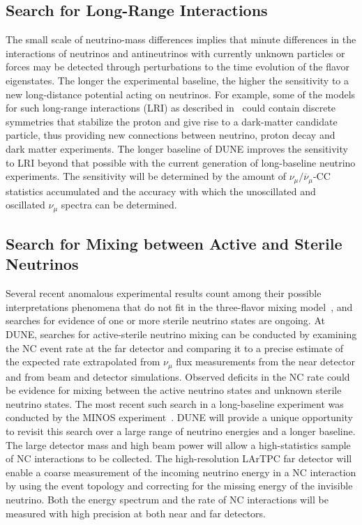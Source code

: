 \subsection{Search for Long-Range Interactions}

The small scale of neutrino-mass differences implies that minute
differences in the interactions of neutrinos and antineutrinos with
currently unknown particles or forces may be detected through 
perturbations to the time evolution of the flavor eigenstates.  
The longer the experimental
baseline, the higher the sensitivity to a new long-distance potential
acting on neutrinos. For example, some of the models for such
long-range interactions (LRI) as described in~\cite{Davoudiasl:2011sz} could contain discrete symmetries that
stabilize the proton and give rise to a dark-matter candidate particle,
thus providing new
connections between neutrino, proton decay and dark matter
experiments. The longer baseline of DUNE improves the sensitivity to
LRI beyond that possible with the current generation of long-baseline
neutrino experiments. The sensitivity will be determined by the amount
of $\nu_\mu/\overline{\nu}_\mu$-CC statistics accumulated and the accuracy
with which the unoscillated and oscillated $\nu_\mu$ spectra can be
determined.

\subsection{Search for Mixing between Active and Sterile Neutrinos}

Several recent anomalous experimental results count among their possible
interpretations phenomena that do not fit in the three-flavor mixing
model~\cite{Aguilar:2001ty,AguilarArevalo:2007it,Aguilar-Arevalo:2013pmq,Mention:2011rk,Giunti:2010zu}, 
and searches for evidence of one or more sterile neutrino states are ongoing.
At DUNE, searches for active-sterile neutrino mixing can be
conducted by examining the NC event rate at the far detector and
comparing it to a precise estimate of the expected rate extrapolated
from $\nu_\mu$ flux measurements from the  
near detector and from 
beam and detector simulations. Observed deficits in the NC rate could be evidence for mixing between the
active neutrino states and unknown sterile neutrino states. The most recent such search
in a long-baseline experiment was conducted by the MINOS
experiment~\cite{Adamson:2011ku,Sousa:2015bxa}.  DUNE will provide a unique
opportunity to revisit this search over a large
range of neutrino energies and a longer baseline. The large detector mass and high beam power will
allow a high-statistics sample of NC interactions to be collected.
The high-resolution LArTPC far detector
will enable a coarse measurement of the incoming neutrino
energy in a NC interaction by using the event topology and correcting
for the missing energy of the invisible neutrino.  Both the
energy spectrum and the rate of NC interactions will be measured
with high precision at both near and far detectors.

